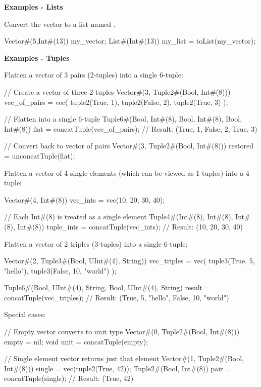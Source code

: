 {\bf Examples - Lists}

Convert the vector  to a list named .
\begin{libverbatim}
     Vector#(5,Int#(13)) my_vector;
     List#(Int#(13)) my_list = toList(my_vector);
\end{libverbatim}

{\bf Examples - Tuples}

Flatten a vector of 3 pairs (2-tuples) into a single 6-tuple:
\begin{libverbatim}
   // Create a vector of three 2-tuples
   Vector#(3, Tuple2#(Bool, Int#(8))) vec_of_pairs = vec(
       tuple2(True, 1),
       tuple2(False, 2),
       tuple2(True, 3)
   );

   // Flatten into a single 6-tuple
   Tuple6#(Bool, Int#(8), Bool, Int#(8), Bool, Int#(8)) flat =
       concatTuple(vec_of_pairs);
   // Result: (True, 1, False, 2, True, 3)

   // Convert back to vector of pairs
   Vector#(3, Tuple2#(Bool, Int#(8))) restored = unconcatTuple(flat);
\end{libverbatim}

Flatten a vector of 4 single elements (which can be viewed as 1-tuples) into a 4-tuple:
\begin{libverbatim}
   Vector#(4, Int#(8)) vec_ints = vec(10, 20, 30, 40);

   // Each Int#(8) is treated as a single element
   Tuple4#(Int#(8), Int#(8), Int#(8), Int#(8)) tuple_ints =
       concatTuple(vec_ints);
   // Result: (10, 20, 30, 40)
\end{libverbatim}

Flatten a vector of 2 triples (3-tuples) into a single 6-tuple:
\begin{libverbatim}
   Vector#(2, Tuple3#(Bool, UInt#(4), String)) vec_triples = vec(
       tuple3(True, 5, "hello"),
       tuple3(False, 10, "world")
   );

   Tuple6#(Bool, UInt#(4), String, Bool, UInt#(4), String) result =
       concatTuple(vec_triples);
   // Result: (True, 5, "hello", False, 10, "world")
\end{libverbatim}

Special cases:
\begin{libverbatim}
   // Empty vector converts to unit type
   Vector#(0, Tuple2#(Bool, Int#(8))) empty = nil;
   void unit = concatTuple(empty);

   // Single element vector returns just that element
   Vector#(1, Tuple2#(Bool, Int#(8))) single =
       vec(tuple2(True, 42));
   Tuple2#(Bool, Int#(8)) pair = concatTuple(single);
   // Result: (True, 42)
\end{libverbatim}


